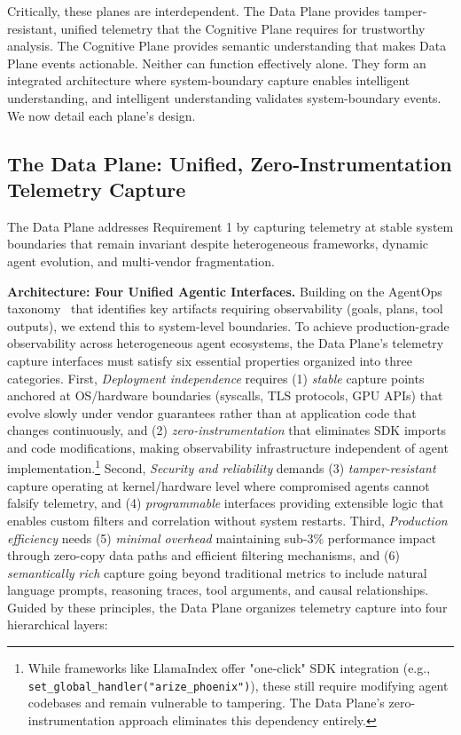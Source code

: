 \documentclass[sigplan,screen,9pt]{acmart}
\begin{document}
Critically, these planes are interdependent. The Data Plane provides tamper-resistant, unified telemetry that the Cognitive Plane requires for trustworthy analysis. The Cognitive Plane provides semantic understanding that makes Data Plane events actionable. Neither can function effectively alone. They form an integrated architecture where system-boundary capture enables intelligent understanding, and intelligent understanding validates system-boundary events. We now detail each plane's design.

\subsection{The Data Plane: Unified, Zero-Instrumentation Telemetry Capture}

The Data Plane addresses Requirement 1 by capturing telemetry at stable system boundaries that remain invariant despite heterogeneous frameworks, dynamic agent evolution, and multi-vendor fragmentation.

\textbf{Architecture: Four Unified Agentic Interfaces.} Building on the AgentOps taxonomy~\cite{Dong2024AgentOps} that identifies key artifacts requiring observability (goals, plans, tool outputs), we extend this to system-level boundaries. To achieve production-grade observability across heterogeneous agent ecosystems, the Data Plane's telemetry capture interfaces must satisfy six essential properties organized into three categories. First, \emph{Deployment independence} requires (1) \emph{stable} capture points anchored at OS/hardware boundaries (syscalls, TLS protocols, GPU APIs) that evolve slowly under vendor guarantees rather than at application code that changes continuously, and (2) \emph{zero-instrumentation} that eliminates SDK imports and code modifications, making observability infrastructure independent of agent implementation.\footnote{While frameworks like LlamaIndex offer "one-click" SDK integration (e.g., \texttt{set\_global\_handler("arize\_phoenix")}), these still require modifying agent codebases and remain vulnerable to tampering. The Data Plane's zero-instrumentation approach eliminates this dependency entirely.} Second, \emph{Security and reliability} demands (3) \emph{tamper-resistant} capture operating at kernel/hardware level where compromised agents cannot falsify telemetry, and (4) \emph{programmable} interfaces providing extensible logic that enables custom filters and correlation without system restarts. Third, \emph{Production efficiency} needs (5) \emph{minimal overhead} maintaining sub-3\% performance impact through zero-copy data paths and efficient filtering mechanisms, and (6) \emph{semantically rich} capture going beyond traditional metrics to include natural language prompts, reasoning traces, tool arguments, and causal relationships. Guided by these principles, the Data Plane organizes telemetry capture into four hierarchical layers:
\end{document}
